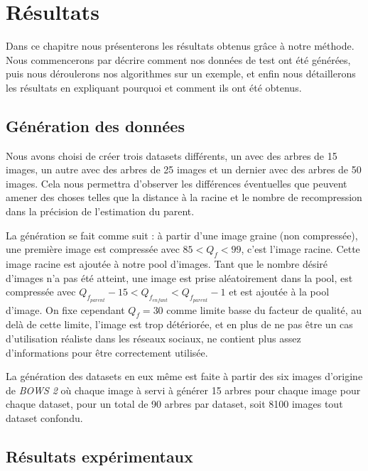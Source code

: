 \documentclass[utf8,final]{stageM2R} %
\begin{document}

\chapter{Résultats}
\label{chap4}

Dans ce chapitre nous présenterons les résultats obtenus grâce à notre méthode. Nous commencerons par décrire comment nos données de test ont été générées, puis nous déroulerons nos algorithmes sur un exemple, et enfin nous détaillerons les résultats en expliquant pourquoi et comment ils ont été obtenus.

\section{Génération des données}
Nous avons choisi de créer trois datasets différents, un avec des arbres de 15 images, un autre avec des arbres de 25 images et un dernier avec des arbres de 50 images. Cela nous permettra d'observer les différences éventuelles que peuvent amener des choses telles que la distance à la racine et le nombre de recompression dans la précision de l'estimation du parent.

La génération se fait comme suit : à partir d'une image graine (non compressée), une première image est compressée avec $85 < Q_f < 99$, c'est l'image racine. Cette image racine est ajoutée à notre pool d'images. Tant que le nombre désiré d'images n'a pas été atteint, une image est prise aléatoirement dans la pool, est compressée avec $Q_{f_{parent}} - 15 < Q_{f_{enfant}} < Q_{f_{parent}} - 1$ et est ajoutée à la pool d'image. On fixe cependant $Q_f = 30$ comme limite basse du facteur de qualité, au delà de cette limite, l'image est trop détériorée, et en plus de ne pas être un cas d'utilisation réaliste dans les réseaux sociaux, ne contient plus assez d'informations pour être correctement utilisée.

La génération des datasets en eux même est faite à partir des six images d'origine de \textit{BOWS 2}\autocite{bows} où chaque image à servi à générer 15 arbres pour chaque image pour chaque dataset, pour un total de 90 arbres par dataset, soit 8100 images tout dataset confondu.

\section{Résultats expérimentaux}
\end{document}
